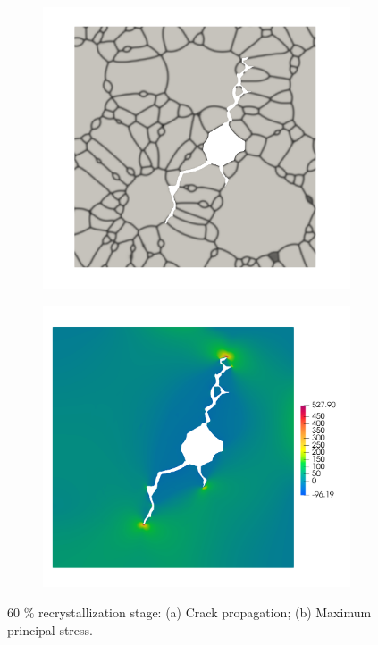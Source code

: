 \begin{figure}[htb!]
  \centering
  \begin{subfigure}[t]{0.49\linewidth}
    \centering
    \includegraphics[width=\linewidth]{Chapter3/figures/partial_hbs_2}
    \caption{}
  \end{subfigure}
  \begin{subfigure}[t]{0.49\linewidth}
    \centering
    \includegraphics[width=\linewidth]{Chapter3/figures/partial_hbs_2_stress}
    \caption{}
  \end{subfigure}
  \caption{\label{fig:partial_hbs_2} 60 $\%$ recrystallization stage: (a) Crack propagation; (b) Maximum principal stress.}
\end{figure}

